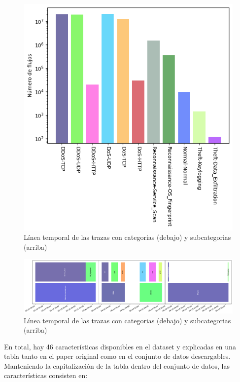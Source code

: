 \begin{figure}[H]
    \begin{center}
        \includegraphics[width=0.49\linewidth]{media/botiot_csv_day_results.png}
    \end{center}
    \captionsetup{justification=centering}
    \caption{Línea temporal de las trazas con categorias (debajo) y subcategorias (arriba)}\label{fig:botiot_results}
\end{figure}

\begin{figure}[!htb]
    \begin{center}
        \includegraphics[width=1\linewidth]{media/botiot_csv_timeline.png}
    \end{center}
    \captionsetup{justification=centering}
    \caption{Línea temporal de las trazas con categorias (debajo) y subcategorias (arriba)}\label{fig:botiot_timeline}
\end{figure}

En total, hay 46 características disponibles en el dataset y explicadas en una tabla tanto en el paper original como en el conjunto de datos descargables. Manteniendo la capitalización de la tabla dentro del conjunto de datos, las características consisten en:

